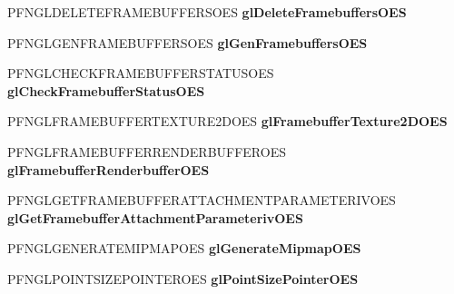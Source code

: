 \begin{DoxyCompactItemize}
\item 
\hypertarget{class_c_p_v_r_tgles_ext_a51580bc2ced5c79b471c7f246be95f7d}{P\+F\+N\+G\+L\+D\+E\+L\+E\+T\+E\+F\+R\+A\+M\+E\+B\+U\+F\+F\+E\+R\+S\+O\+E\+S {\bfseries gl\+Delete\+Framebuffers\+O\+E\+S}}\label{class_c_p_v_r_tgles_ext_a51580bc2ced5c79b471c7f246be95f7d}

\item 
\hypertarget{class_c_p_v_r_tgles_ext_a12c5082e833b0002a78586785e9c8b9c}{P\+F\+N\+G\+L\+G\+E\+N\+F\+R\+A\+M\+E\+B\+U\+F\+F\+E\+R\+S\+O\+E\+S {\bfseries gl\+Gen\+Framebuffers\+O\+E\+S}}\label{class_c_p_v_r_tgles_ext_a12c5082e833b0002a78586785e9c8b9c}

\item 
\hypertarget{class_c_p_v_r_tgles_ext_a8ea0487944e3b4ee7f6471e67bcba27d}{P\+F\+N\+G\+L\+C\+H\+E\+C\+K\+F\+R\+A\+M\+E\+B\+U\+F\+F\+E\+R\+S\+T\+A\+T\+U\+S\+O\+E\+S {\bfseries gl\+Check\+Framebuffer\+Status\+O\+E\+S}}\label{class_c_p_v_r_tgles_ext_a8ea0487944e3b4ee7f6471e67bcba27d}

\item 
\hypertarget{class_c_p_v_r_tgles_ext_ad0c974db68b799e8d6f7ab03c23ee366}{P\+F\+N\+G\+L\+F\+R\+A\+M\+E\+B\+U\+F\+F\+E\+R\+T\+E\+X\+T\+U\+R\+E2\+D\+O\+E\+S {\bfseries gl\+Framebuffer\+Texture2\+D\+O\+E\+S}}\label{class_c_p_v_r_tgles_ext_ad0c974db68b799e8d6f7ab03c23ee366}

\item 
\hypertarget{class_c_p_v_r_tgles_ext_a400ce4a63b1bd40e45f71d60eff07b0b}{P\+F\+N\+G\+L\+F\+R\+A\+M\+E\+B\+U\+F\+F\+E\+R\+R\+E\+N\+D\+E\+R\+B\+U\+F\+F\+E\+R\+O\+E\+S {\bfseries gl\+Framebuffer\+Renderbuffer\+O\+E\+S}}\label{class_c_p_v_r_tgles_ext_a400ce4a63b1bd40e45f71d60eff07b0b}

\item 
\hypertarget{class_c_p_v_r_tgles_ext_acd5b657bc390d3a7dd97a515195bc83f}{P\+F\+N\+G\+L\+G\+E\+T\+F\+R\+A\+M\+E\+B\+U\+F\+F\+E\+R\+A\+T\+T\+A\+C\+H\+M\+E\+N\+T\+P\+A\+R\+A\+M\+E\+T\+E\+R\+I\+V\+O\+E\+S {\bfseries gl\+Get\+Framebuffer\+Attachment\+Parameteriv\+O\+E\+S}}\label{class_c_p_v_r_tgles_ext_acd5b657bc390d3a7dd97a515195bc83f}

\item 
\hypertarget{class_c_p_v_r_tgles_ext_a913f1a5bbe145a202bb7e819c6f98054}{P\+F\+N\+G\+L\+G\+E\+N\+E\+R\+A\+T\+E\+M\+I\+P\+M\+A\+P\+O\+E\+S {\bfseries gl\+Generate\+Mipmap\+O\+E\+S}}\label{class_c_p_v_r_tgles_ext_a913f1a5bbe145a202bb7e819c6f98054}

\item 
\hypertarget{class_c_p_v_r_tgles_ext_acee544477372d6c000eaf7a055f3803b}{P\+F\+N\+G\+L\+P\+O\+I\+N\+T\+S\+I\+Z\+E\+P\+O\+I\+N\+T\+E\+R\+O\+E\+S {\bfseries gl\+Point\+Size\+Pointer\+O\+E\+S}}\label{class_c_p_v_r_tgles_ext_acee544477372d6c000eaf7a055f3803b}


\end{DoxyCompactItemize}
